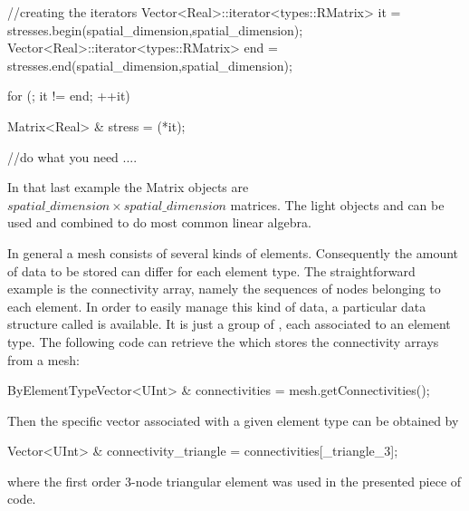 \begin{cpp}
  //creating the iterators
  Vector<Real>::iterator<types::RMatrix> it  = stresses.begin(spatial_dimension,spatial_dimension);
  Vector<Real>::iterator<types::RMatrix> end = stresses.end(spatial_dimension,spatial_dimension);
  
  for (; it != end; ++it){
    Matrix<Real> & stress = (*it);
    
    //do what you need
    ....
    
  }
\end{cpp}
In that last example the Matrix objects are 
$spatial\_dimension \times spatial\_dimension$ matrices.
The light objects  and  can be used and combined 
to do most common linear algebra.

In general a mesh consists of several kinds of elements. Consequently the 
amount of data to be stored can differ for each element type. The straightforward 
example is the connectivity array, namely the sequences of nodes belonging to
each element. In order to easily manage this kind of data, a
particular data structure called  is available. 
It is just a group of , each associated to an element
type. The following code can retrieve the 
which stores the connectivity arrays from a mesh:
\begin{cpp}
  ByElementTypeVector<UInt> & connectivities = mesh.getConnectivities();
\end{cpp}
Then the specific vector associated with a given element type can be 
obtained by
\begin{cpp}
  Vector<UInt> & connectivity_triangle = connectivities[_triangle_3];
\end{cpp}
where the first order 3-node triangular element was used in the presented 
piece of code.



